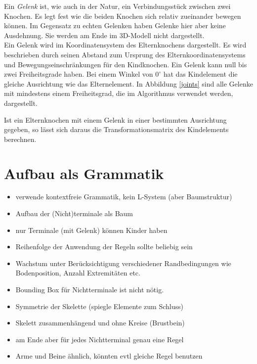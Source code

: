 Ein \emph{Gelenk} ist, wie auch in der Natur, ein Verbindungsstück zwischen zwei Knochen. Es legt fest wie die beiden Knochen sich relativ zueinander bewegen können. Im Gegensatz zu echten Gelenken haben Gelenke hier aber keine Ausdehnung. Sie werden am Ende im 3D-Modell nicht dargestellt.\\
Ein Gelenk wird im Koordinatensystem des Elternknochens dargestellt. Es wird beschrieben durch seinen Abstand zum Ursprung des Elternkoordinatensystems und Bewegungseinschränkungen für den Kindknochen. Ein Gelenk kann null bis zwei Freiheitsgrade haben. Bei einem Winkel von $0^\circ$ hat das Kindelement die gleiche Ausrichtung wie das Elternelement. In Abbildung \ref{joints} sind alle Gelenke mit mindestens einem Freiheitsgrad, die im Algorithmus verwendet werden, dargestellt.

Ist ein Elternknochen mit einem Gelenk in einer bestimmten Ausrichtung gegeben, so lässt sich daraus die Transformationsmatrix des Kindelements berechnen.


\section{Aufbau als Grammatik}
\label{section:grammar}



\begin{itemize}
  \item verwende kontextfreie Grammatik, kein L-System (aber Baumstruktur)
  
  \item Aufbau der (Nicht)terminale als Baum
  \item nur Terminale (mit Gelenk) können Kinder haben
  \item Reihenfolge der Anwendung der Regeln sollte beliebig sein
  
  \item Wachstum unter Berücksichtigung verschiedener Randbedingungen wie Bodenposition, Anzahl Extremitäten etc.\
  \item Bounding Box für Nichtterminale ist nicht nötig.
  
  \item Symmetrie der Skelette (spiegle Elemente zum Schluss)
  \item Skelett zusammenhängend und ohne Kreise (Brustbein)
  
  \item am Ende aber für jedes Nichtterminal genau eine Regel
  \item Arme und Beine ähnlich, könnten evtl gleiche Regel benutzen
 \end{itemize}
 
